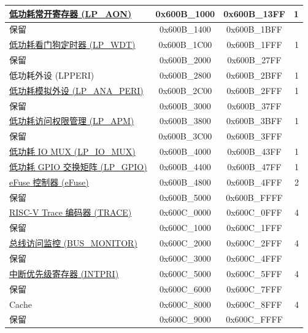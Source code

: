 \begin{ThreePartTable}
\begin{longtable}[c]{ |p{7cm}|c|c|r| }
\hyperref[mod:lowpowm]{低功耗常开寄存器 (LP\_AON)}                     & 0x600B\_1000 & 0x600B\_13FF &   1     \\\hline
    \rowcolor{gray!25}  保留                    & 0x600B\_1400 & 0x600B\_1BFF &         \\\hline
\hyperref[mod:wdt]{低功耗看门狗定时器 (LP\_WDT)}                     & 0x600B\_1C00 & 0x600B\_1FFF &   1     \\\hline
    \rowcolor{gray!25}  保留                    & 0x600B\_2000 & 0x600B\_27FF &         \\\hline
低功耗外设 (LPPERI)                      & 0x600B\_2800 & 0x600B\_2BFF &   1     \\\hline
\hyperref[mod:lowpowm]{低功耗模拟外设 (LP\_ANA\_PERI)}               & 0x600B\_2C00 & 0x600B\_2FFF &   1     \\\hline
    \rowcolor{gray!25}  保留                    & 0x600B\_3000 & 0x600B\_37FF &         \\\hline
\hyperref[mod:permctrl]{低功耗访问权限管理 (LP\_APM)} \tnote{\textcolor{red}{2}}                     & 0x600B\_3800 & 0x600B\_3BFF &   1     \\\hline
    \rowcolor{gray!25}  保留                    & 0x600B\_3C00 & 0x600B\_3FFF &         \\\hline
\hyperref[mod:iomuxgpio]{低功耗 IO MUX (LP\_IO\_MUX)}                     & 0x600B\_4000 & 0x600B\_43FF &   1     \\\hline
\hyperref[mod:iomuxgpio]{低功耗 GPIO 交换矩阵 (LP\_GPIO)}                     & 0x600B\_4400 & 0x600B\_47FF &   1     \\\hline
\hyperref[mod:efuse]{eFuse 控制器 (eFuse)}                       & 0x600B\_4800 & 0x600B\_4FFF &   2     \\\hline
    \rowcolor{gray!25}  保留                    & 0x600B\_5000 & 0x600B\_FFFF &         \\\hline
\hyperref[mod:riscvtracenc]{RISC-V Trace 编码器 (TRACE)}                       & 0x600C\_0000 & 0x600C\_0FFF &   4     \\\hline
    \rowcolor{gray!25}  保留                    & 0x600C\_1000 & 0x600C\_1FFF &         \\\hline
\hyperref[mod:dbgassist]{总线访问监控 (BUS\_MONITOR) \tnote{\textcolor{red}{2}}}               & 0x600C\_2000 & 0x600C\_2FFF &   4     \\\hline
    \rowcolor{gray!25}  保留                    & 0x600C\_3000 & 0x600C\_4FFF &         \\\hline
\hyperref[mod:riscvcpu]{中断优先级寄存器 (INTPRI)}                & 0x600C\_5000 & 0x600C\_5FFF &   4     \\\hline
    \rowcolor{gray!25}  保留                    & 0x600C\_6000 & 0x600C\_7FFF &         \\\hline
Cache                & 0x600C\_8000 & 0x600C\_8FFF &   4     \\\hline
    \rowcolor{gray!25}  保留                    & 0x600C\_9000 & 0x600C\_FFFF &         \\\hline
    
\end{longtable}
\end{ThreePartTable}
